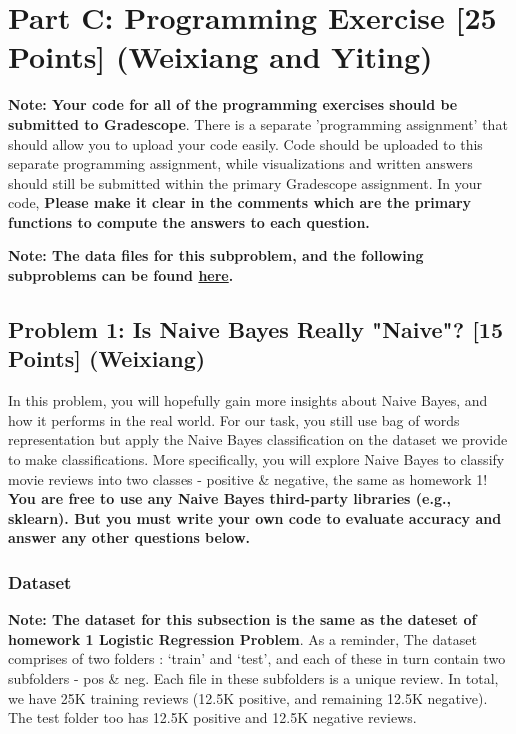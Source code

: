 \documentclass{article}
\begin{document}
\newpage


\section*{Part C: Programming Exercise [25 Points] (Weixiang and Yiting)}

\textbf{Note: Your code for all of the programming exercises should be submitted to Gradescope}. There is a separate 'programming assignment' that should allow you to upload your code easily. Code should be uploaded to this separate programming assignment, while visualizations and written answers should still be submitted within the primary Gradescope assignment. In your code, \textbf{Please make it clear in the comments which are the primary functions to compute the answers to each question.}

\textbf{Note: The data files for this subproblem, and the following subproblems can be found \href{https://www.dropbox.com/s/amirx7n7aewxzga/10-701_HW2_Dataset.zip?dl=0}{here}.}

\subsection*{Problem 1: Is Naive Bayes Really "Naive"? [15 Points] (Weixiang)} 
In this problem, you will hopefully gain more insights about Naive Bayes, and how it performs in the real world. For our task, you still use bag of words representation but apply the Naive Bayes classification on the dataset we provide to make classifications. More specifically, you will explore Naive Bayes to classify movie reviews into two classes - positive \& negative, the same as homework 1! \textbf{You are free to use any Naive Bayes third-party libraries (e.g., sklearn). But you must write your own code to evaluate accuracy and answer any other questions below.} 

\subsubsection*{Dataset}
\textbf{Note: The dataset for this subsection is the same as the dateset of homework 1 Logistic Regression Problem}. As a reminder, The dataset comprises of two folders : `train' and `test', and each of these in turn contain two subfolders - pos \& neg. Each file in these subfolders is a unique review. In total, we have 25K training reviews (12.5K positive, and remaining 12.5K negative). The test folder too has 12.5K positive and 12.5K negative reviews. 
\end{document}
